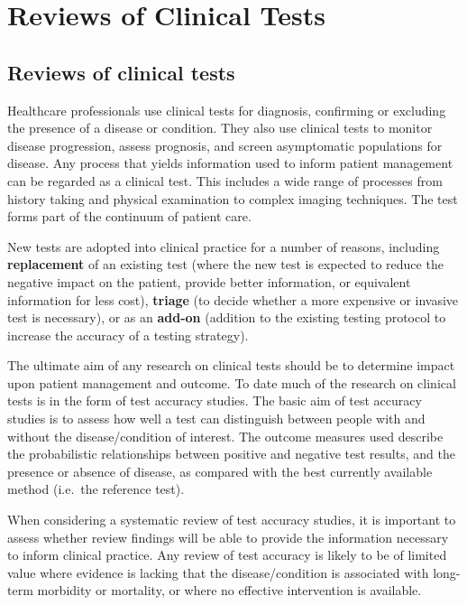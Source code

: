 \documentclass[
  11pt,
  a4paper,
  DIV=11,
  numbers=noendperiod]{scrreprt}
\begin{document}
\part{Reviews of Clinical Tests}

\chapter{Reviews of clinical tests}\label{reviews-of-clinical-tests-1}

Healthcare professionals use clinical tests for diagnosis, confirming or
excluding the presence of a disease or condition. They also use clinical
tests to monitor disease progression, assess prognosis, and screen
asymptomatic populations for disease. Any process that yields
information used to inform patient management can be regarded as a
clinical test. This includes a wide range of processes from history
taking and physical examination to complex imaging techniques. The test
forms part of the continuum of patient care.

New tests are adopted into clinical practice for a number of reasons,
including \textbf{replacement} of an existing test (where the new test
is expected to reduce the negative impact on the patient, provide better
information, or equivalent information for less cost), \textbf{triage}
(to decide whether a more expensive or invasive test is necessary), or
as an \textbf{add-on} (addition to the existing testing protocol to
increase the accuracy of a testing strategy).

The ultimate aim of any research on clinical tests should be to
determine impact upon patient management and outcome. To date much of
the research on clinical tests is in the form of test accuracy studies.
The basic aim of test accuracy studies is to assess how well a test can
distinguish between people with and without the disease/condition of
interest. The outcome measures used describe the probabilistic
relationships between positive and negative test results, and the
presence or absence of disease, as compared with the best currently
available method (i.e.~the reference test).

When considering a systematic review of test accuracy studies, it is
important to assess whether review findings will be able to provide the
information necessary to inform clinical practice. Any review of test
accuracy is likely to be of limited value where evidence is lacking that
the disease/condition is associated with long-term morbidity or
mortality, or where no effective intervention is available.
\end{document}
